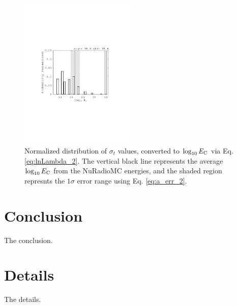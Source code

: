 \documentclass[amsmath,amssymb,aps,prd,10pt,twocolumn,showkeys]{revtex4}
\begin{document}
\begin{itemize}
\begin{figure}
\centering
\includegraphics[width=0.5\textwidth,trim=3.25cm 8.25cm 4.5cm 8.25cm,clip=true]{Aug19_plot1.pdf}
\caption{\label{fig:fig6} Normalized distribution of $\sigma_t$ values, converted to $\log_{10}E_{\rm C}$ via Eq. \ref{eq:lnLambda_2}.  The vertical black line represents the average $\log_{10}E_{\rm C}$ from the NuRadioMC energies, and the shaded region represnts the $1\sigma$ error range using Eq. \ref{eq:a_err_2}.}
\end{figure}

\end{itemize}

\section{Conclusion}
\label{sec:conc}

The conclusion.

\appendix

\section{Details}
\label{app:a}

The details.


\end{document}
